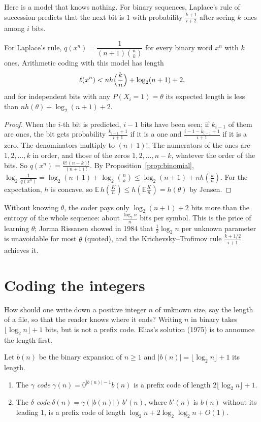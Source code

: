 Here is a model that knows nothing. For binary sequences, Laplace's rule of succession predicts that the next bit is $1$ with probability $\frac{k+1}{i+2}$ after seeing $k$ ones among $i$ bits.

\begin{proposition}\label{prop:laplace}
For Laplace's rule, $q(x^n)=\dfrac1{(n+1)\binom nk}$ for every binary word $x^n$ with $k$ ones. Arithmetic coding with this model has length
\[
\ell(x^n)<nh\Bigl(\frac kn\Bigr)+\log_2(n+1)+2,
\]
and for independent bits with any $P(X_i=1)=\theta$ its expected length is less than $nh(\theta)+\log_2(n+1)+2$.
\end{proposition}

\begin{proof}
When the $i$-th bit is predicted, $i-1$ bits have been seen; if $k_{i-1}$ of them are ones, the bit gets probability $\frac{k_{i-1}+1}{i+1}$ if it is a one and $\frac{i-1-k_{i-1}+1}{i+1}$ if it is a zero. The denominators multiply to $(n+1)!$. The numerators of the ones are $1,2,\dots,k$ in order, and those of the zeros $1,2,\dots,n-k$, whatever the order of the bits. So $q(x^n)=\frac{k!\,(n-k)!}{(n+1)!}$. By Proposition~\ref{prop:binomial}, $\log_2\frac1{q(x^n)}=\log_2(n+1)+\log_2\binom nk\le\log_2(n+1)+nh(\frac kn)$. For the expectation, $h$ is concave, so $\mathbb E\,h(\frac Kn)\le h(\mathbb E\frac Kn)=h(\theta)$ by Jensen.
\end{proof}

Without knowing $\theta$, the coder pays only $\log_2(n+1)+2$ bits more than the entropy of the whole sequence: about $\frac{\log_2n}n$ bits per symbol. This is the price of learning $\theta$; Jorma Rissanen showed in 1984 that $\frac12\log_2n$ per unknown parameter is unavoidable for most $\theta$ (quoted), and the Krichevsky--Trofimov rule $\frac{k+1/2}{i+1}$ achieves it.

\section{Coding the integers}\label{sec:elias}

How should one write down a positive integer $n$ of unknown size, say the length of a file, so that the reader knows where it ends? Writing $n$ in binary takes $\lfloor\log_2n\rfloor+1$ bits, but is not a prefix code. Elias's solution (1975) is to announce the length first.

\begin{proposition}\label{prop:elias}
Let $b(n)$ be the binary expansion of $n\ge1$ and $|b(n)|=\lfloor\log_2n\rfloor+1$ its length.
\begin{enumerate}[label=(\alph*)]
\item The \emph{$\gamma$ code} $\gamma(n)=0^{|b(n)|-1}b(n)$ is a prefix code of length $2\lfloor\log_2n\rfloor+1$.
\item The \emph{$\delta$ code} $\delta(n)=\gamma(|b(n)|)\,b'(n)$, where $b'(n)$ is $b(n)$ without its leading $1$, is a prefix code of length $\log_2n+2\log_2\log_2n+O(1)$.
\end{enumerate}
\end{proposition}

